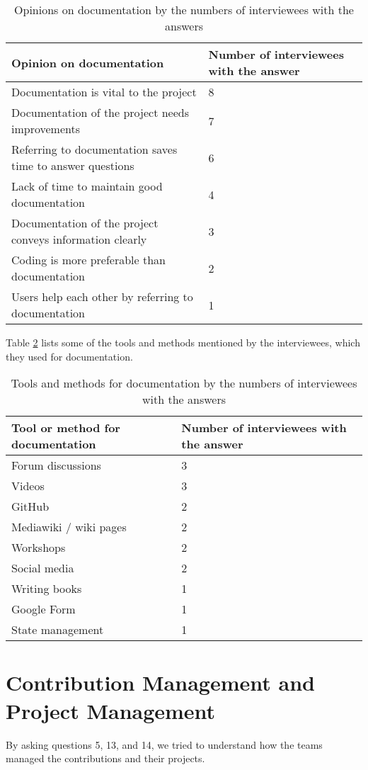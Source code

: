 \begin{table}[H]
\centering
\begin{tabular}{ll}
\hline
Opinion on documentation & Number of interviewees with the answer \\ \hline
Documentation is vital to the project& 8 \\
Documentation of the project needs improvements & 7 \\
Referring to documentation saves time to answer questions & 6 \\
Lack of time to maintain good documentation & 4 \\
Documentation of the project conveys information clearly & 3 \\
Coding is more preferable than documentation & 2 \\
Users help each other by referring to documentation & 1 \\ \hline
\end{tabular}
\caption{\label{tab_opinion_doc}Opinions on documentation by the numbers of interviewees with the answers}
\end{table}

Table \ref{tab_doc_tools} lists some of the tools and methods mentioned by the interviewees, which they used for documentation.

\begin{table}[H]
\centering
\begin{tabular}{ll}
\hline
Tool or method for documentation & Number of interviewees with the answer \\ \hline
Forum discussions & 3 \\
Videos & 3 \\
GitHub & 2 \\
Mediawiki / wiki pages & 2 \\
Workshops & 2 \\
Social media & 2 \\
Writing books & 1 \\
Google Form & 1 \\
State management & 1 \\ \hline
\end{tabular}
\caption{\label{tab_doc_tools}Tools and methods for documentation by the numbers of interviewees with the answers}
\end{table}

\section{Contribution Management and Project Management}
By asking questions 5, 13, and 14, we tried to understand how the teams managed the contributions and their projects.

